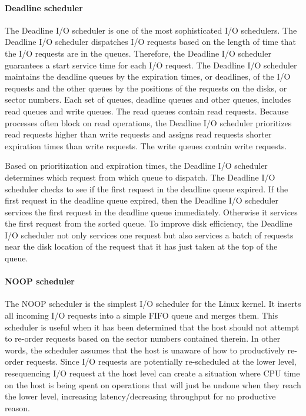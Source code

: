 \documentclass{acmsig}
\begin{document}
    \paragraph{Deadline scheduler}
    The Deadline I/O scheduler is one of the most sophisticated I/O schedulers. The Deadline I/O scheduler dispatches I/O requests based on the length of time that the I/O requests are in the queues. Therefore, the Deadline I/O scheduler guarantees a start service time for each I/O request. The Deadline I/O scheduler maintains the deadline queues by the expiration times, or deadlines, of the I/O requests and the other queues by the positions of the requests on the disks, or sector numbers. Each set of queues, deadline queues and other queues, includes read queues and write queues. The read queues contain read requests. Because processes often block on read operations, the Deadline I/O scheduler prioritizes read requests higher than write requests and assigns read requests shorter expiration times than write requests. The write queues contain write requests.

    Based on prioritization and expiration times, the Deadline I/O scheduler determines which request from which queue to dispatch. The Deadline I/O scheduler checks to see if the first request in the deadline queue expired. If the first request in the deadline queue expired, then the Deadline I/O scheduler services the first request in the deadline queue immediately. Otherwise it services the first request from the sorted queue. To improve disk efficiency, the Deadline I/O scheduler not only services one request but also services a batch of requests near the disk location of the request that it has just taken at the top of the queue.

    \paragraph{NOOP scheduler}
    The NOOP scheduler is the simplest I/O scheduler for the Linux kernel. It inserts all incoming I/O requests into a simple FIFO queue and merges them. This scheduler is useful when it has been determined that the host should not attempt to re-order requests based on the sector numbers contained therein. In other words, the scheduler assumes that the host is unaware of how to productively re-order requests. Since I/O requests are potentially re-scheduled at the lower level, resequencing I/O request at the host level can create a situation where CPU time on the host is being spent on operations that will just be undone when they reach the lower level, increasing latency/decreasing throughput for no productive reason.
\end{document}
